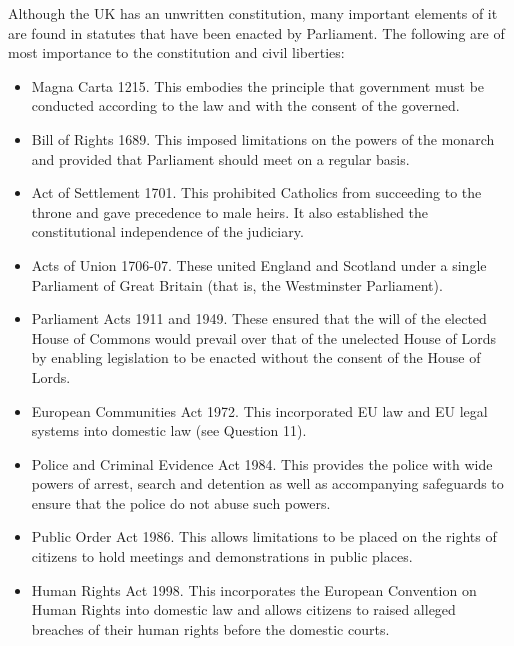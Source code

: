 \documentclass[14pt,titlepage]{extarticle}
\begin{document}
Although the UK has an unwritten constitution, many important elements of it are found in statutes that have been enacted by Parliament. The following are of most importance to the constitution and civil liberties:

\begin{itemize}
  
\item Magna Carta 1215. This embodies the principle that government must be conducted according to the law and with the consent of the governed.

\item Bill of Rights 1689. This imposed limitations on the powers of the monarch and provided that Parliament should meet on a regular basis.

\item Act of Settlement 1701. This prohibited Catholics from succeeding to the throne and gave precedence to male heirs. It also established the constitutional independence of the judiciary.

\item Acts of Union 1706-07. These united England and Scotland under a single Parliament of Great Britain (that is, the Westminster Parliament).

\item Parliament Acts 1911 and 1949. These ensured that the will of the elected House of Commons would prevail over that of the unelected House of Lords by enabling legislation to be enacted without the consent of the House of Lords.

\item European Communities Act 1972. This incorporated EU law and EU legal systems into domestic law (see Question 11).

\item Police and Criminal Evidence Act 1984. This provides the police with wide powers of arrest, search and detention as well as accompanying safeguards to ensure that the police do not abuse such powers.

\item Public Order Act 1986. This allows limitations to be placed on the rights of citizens to hold meetings and demonstrations in public places.

\item Human Rights Act 1998. This incorporates the European Convention on Human Rights into domestic law and allows citizens to raised alleged breaches of their human rights before the domestic courts.


\end{itemize}
\end{document}
